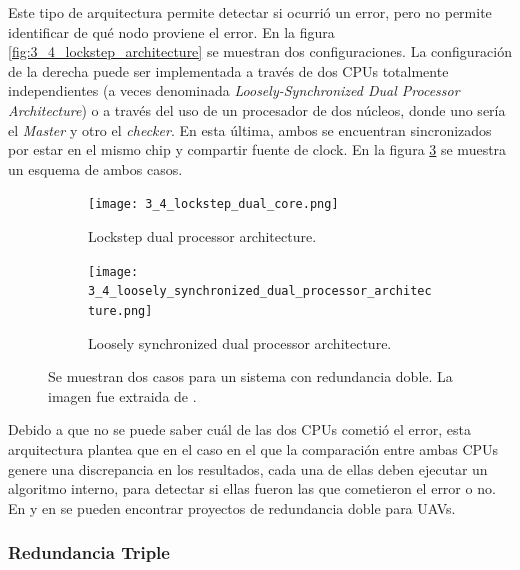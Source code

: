 Este tipo de arquitectura permite detectar si ocurrió un error, pero no permite identificar de qué nodo proviene el error. En la figura \ref{fig:3_4_lockstep_architecture} se muestran dos configuraciones. La configuración de la derecha puede ser implementada a través de dos CPUs totalmente independientes (a veces denominada \textit{Loosely-Synchronized Dual Processor Architecture}) o a través del uso de un procesador de dos núcleos, donde uno sería el \textit{Master} y otro el \textit{checker}\cite{baleani2003fault}. En esta última, ambos se encuentran sincronizados por estar en el mismo chip y compartir fuente de clock. En la figura \ref{fig:3_4_lockstep_architecture_2} se muestra un esquema de ambos casos.

\begin{figure}[H]
    \centering
    \begin{subfigure}[b]{0.49\textwidth}
        \texttt{[image: 3\_4\_lockstep\_dual\_core.png]}
        \caption{Lockstep dual processor architecture.}
        \label{fig:3_4_lockstep_dual_core}
    \end{subfigure}
    \begin{subfigure}[b]{0.49\textwidth}
        \texttt{[image: 3\_4\_loosely\_synchronized\_dual\_processor\_architecture.png]}
        \caption{Loosely synchronized dual processor architecture.}
        \label{fig:3_4_loosely_synchronized_dual_processor_architecture}
    \end{subfigure}
    \caption{Se muestran dos casos para un sistema con redundancia doble. La imagen fue extraida de \cite{baleani2003fault}.}
    \label{fig:3_4_lockstep_architecture_2}
\end{figure}

Debido a que no se puede saber cuál de las dos CPUs cometió el error, esta arquitectura plantea que en el caso en el que la comparación entre ambas CPUs genere una discrepancia en los resultados, cada una de ellas deben ejecutar un algoritmo interno, para detectar si ellas fueron las que cometieron el error o no. En \cite{zhang2015dual} y en \cite{SolanoPerez2019} se pueden encontrar proyectos de redundancia doble para UAVs.

\subsubsection{Redundancia Triple}

